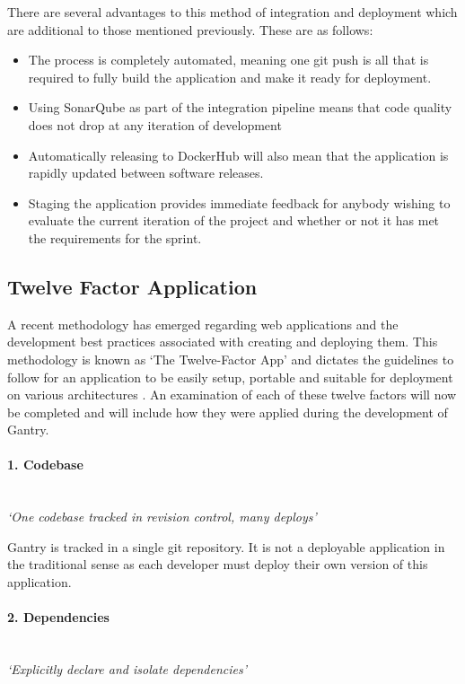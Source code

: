 There are several advantages to this method of integration and deployment which are additional to those mentioned previously. These are as follows:

\begin{itemize}
	\item The process is completely automated, meaning one git push is all that is required to fully build the application and make it ready for deployment.
	\item Using SonarQube as part of the integration pipeline means that code quality does not drop at any iteration of development
	\item Automatically releasing to DockerHub will also mean that the application is rapidly updated between software releases.
	\item Staging the application provides immediate feedback for anybody wishing to evaluate the current iteration of the project and whether or not it has met the requirements for the sprint.
\end{itemize} 

\subsection{Twelve Factor Application}
A recent methodology has emerged regarding web applications and the development best practices associated with creating and deploying them. This methodology is known as `The Twelve-Factor App' and dictates the guidelines to follow for an application to be easily setup, portable and suitable for deployment on various architectures \citep{Wiggins2017}. An examination of each of these twelve factors will now be completed and will include how they were applied during the development of Gantry.

\paragraph{1. Codebase}\mbox{}\\
\textit{`One codebase tracked in revision control, many deploys'}

Gantry is tracked in a single \gls{git} repository. It is not a deployable application in the traditional sense as each developer must deploy their own version of this application.

\paragraph{2. Dependencies}\mbox{}\\
\textit{`Explicitly declare and isolate dependencies'}

